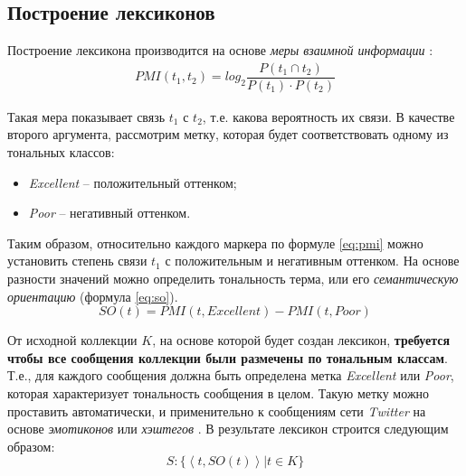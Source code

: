 \subsection{Построение лексиконов}

Построение лексикона производится на основе {\it меры взаимной информации}
\cite{lexiconSO}:
\begin{gather}
    PMI(t_1, t_2) = log_2 \dfrac{P(t_1\cap t_2)}{P(t_1)\cdot P(t_2)}
    \label{eq:pmi}
\end{gather}

Такая мера показывает связь $t_1$ с $t_2$, т.е. какова вероятность их связи.
В качестве второго аргумента, рассмотрим метку, которая будет соответствовать
одному из тональных классов:
\begin{itemize}
    \item {\it Excellent} -- положительный оттенком;
    \item {\it Poor} -- негативный оттенком.
\end{itemize}

Таким образом, относительно каждого маркера по формуле \ref{eq:pmi} можно
установить степень связи $t_1$ с положительным и негативным оттенком.
На основе разности значений можно определить тональность терма, или его
{\it семантическую ориентацию} (формула \ref{eq:so}).
\begin{equation}
    \label{eq:so}
    SO(t) = PMI(t, Excellent) - PMI(t, Poor)
\end{equation}

От исходной коллекции $K$, на основе которой будет создан лексикон, {\bf требуется
чтобы все сообщения коллекции были размечены по тональным классам}.
Т.е., для каждого сообщения должна быть определена метка {\it Excellent} или
{\it Poor}, которая характеризует тональность сообщения в целом.
Такую метку можно проставить автоматически, и применительно к сообщениям
сети {\it Twitter} на основе {\it эмотиконов} или {\it хэштегов} \cite{severyn}.
В результате лексикон строится следующим образом:
\begin{equation}
    S : \{ \left< t, SO(t) \right> | t \in K\}
\end{equation}

